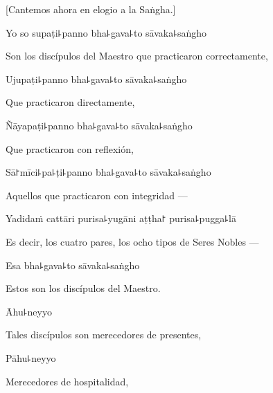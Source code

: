 \begin{leader}
\end{leader}

\begin{english}
  [Cantemos ahora en elogio a la Saṅgha.]
\end{english}

Yo so supaṭi꜕panno bha꜕gava꜕to sāvaka꜕saṅgho

\begin{english}
  Son los discípulos del Maestro que practicaron correctamente,
\end{english}

Ujupaṭi꜕panno bha꜕gava꜕to sāvaka꜕saṅgho

\begin{english}
  Que practicaron directamente,
\end{english}

Ñāyapaṭi꜕panno bha꜕gava꜕to sāvaka꜕saṅgho

\begin{english}
  Que practicaron con reflexión,
\end{english}

Sā꜓mīci꜕pa꜕ṭi꜕panno bha꜕gava꜕to sāvaka꜕saṅgho

\begin{english}
  Aquellos que practicaron con integridad ---
\end{english}

Yadidaṁ cattāri purisa꜕yugāni aṭṭha꜓ purisa꜕pugga꜕lā

\begin{english}
  Es decir, los cuatro pares, los ocho tipos de Seres Nobles ---
\end{english}

Esa bha꜕gava꜕to sāvaka꜕saṅgho

\begin{english}
 Estos son los discípulos del Maestro.
\end{english}

Āhu꜕neyyo

\begin{english}
  Tales discípulos son merecedores de presentes,
\end{english}

Pāhu꜕neyyo

\begin{english}
  Merecedores de hospitalidad,
\end{english}

\clearpage

